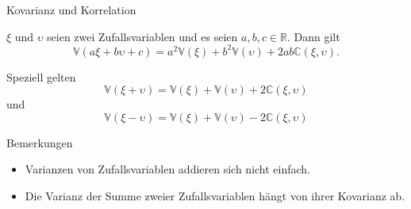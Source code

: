 \documentclass[
  8pt,
  ignorenonframetext,
]{beamer}
\providecommand{\tightlist}{%
  \setlength{\itemsep}{0pt}\setlength{\parskip}{0pt}}
\newcommand{\ups}{\upsilon}
\begin{document}
\begin{frame}{Kovarianz und Korrelation}
\protect\hypertarget{kovarianz-und-korrelation-4}{}
\small
\begin{theorem}
\normalfont
\justifying
$\xi$ und $\ups$ seien zwei Zufallsvariablen und es seien $a,b,c \in \mathbb{R}$. Dann gilt
\begin{equation}
\mathbb{V}(a\xi + b\ups + c) = a^2\mathbb{V}(\xi) + b^2\mathbb{V}(\ups) + 2ab\mathbb{C}(\xi,\ups).
\end{equation}

Speziell gelten
\begin{equation}
\mathbb{V}(\xi+\ups) = \mathbb{V}(\xi) + \mathbb{V}(\ups) + 2 \mathbb{C}(\xi,\ups)
\end{equation}
und
\begin{equation}
\mathbb{V}(\xi-\ups) = \mathbb{V}(\xi) + \mathbb{V}(\ups) - 2 \mathbb{C}(\xi,\ups)
\end{equation}
\end{theorem}

\footnotesize

Bemerkungen

\begin{itemize}
\tightlist
\item
  Varianzen von Zufallsvariablen addieren sich nicht einfach.
\item
  Die Varianz der Summe zweier Zufallsvariablen hängt von ihrer
  Kovarianz ab.
\end{itemize}
\end{frame}
\end{document}
